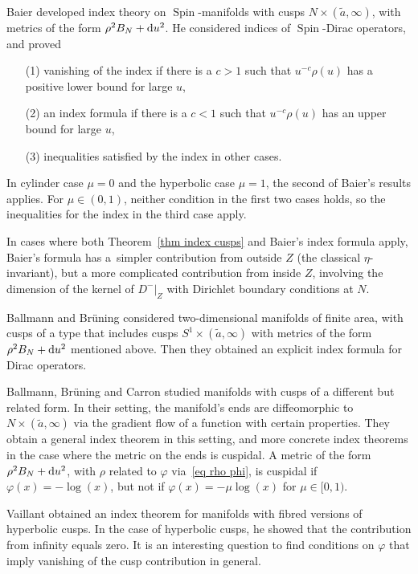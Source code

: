 \documentclass[pdftex]{sigma}%
\numberwithin{equation}{section}
\DeclareMathOperator{\Spin}{Spin}
\begin{document}
Baier \cite{Baier02} developed
index theory on $\Spin$-manifolds with cusps $N\times (\tilde a, \infty)$, with metrics of the form $\rho^2 B_N + {\rm d}u^2$.
He considered indices of $\Spin$-Dirac operators, and proved
\begin{enumerate}\itemsep=0pt
\item[(1)] vanishing of the index if there is a $c>1$ such that $u^{-c} \rho(u)$ has a positive lower bound for large $u$,
\item[(2)] an index formula if there is a $c<1$ such that $u^{-c} \rho(u)$ has an upper bound for large $u$,
\item[(3)] inequalities satisfied by the index in other cases.
\end{enumerate}

 In cylinder case $\mu = 0$ and the hyperbolic case $\mu = 1$, the second of Baier's results applies. For $\mu \in (0,1)$, neither condition in the first two cases holds, so the inequalities for the index in the third case apply.

In cases where both Theorem~\ref{thm index cusps} and Baier's index formula apply, Baier's formula has a~simpler contribution from outside $Z$ (the classical $\eta$-invariant), but a more complicated contribution from inside $Z$, involving the dimension of the kernel of $D^-|_Z$ with Dirichlet boundary conditions at $N$.

Ballmann and
Br\"uning \cite{BB03} considered two-dimensional manifolds of finite area, with cusps of a type that includes
 cusps $S^1 \times (\tilde a, \infty)$ with metrics of the form $\rho^2 B_N + {\rm d}u^2$ mentioned above. Then they obtained an explicit index formula for Dirac operators.

 Ballmann,
Br\"uning and Carron \cite{BBC12} studied manifolds with cusps of a different but related form. In their setting, the manifold's ends are diffeomorphic to $N \times (\tilde a, \infty)$ via the gradient flow of a function with certain properties. They obtain a general index theorem in this setting, and more concrete index theorems in the case where the metric on the ends is cuspidal. A metric of the form $\rho^2 B_N + {\rm d}u^2$, with $\rho$ related to $\varphi$ via~\eqref{eq rho phi}, is cuspidal if $\varphi(x) =-\log(x)$, but not if $\varphi(x) =-\mu \log(x)$ for $\mu \in [0,1)$.

Vaillant \cite{Vaillant01} obtained an index theorem for manifolds with fibred versions of hyperbolic cusps. In the case of hyperbolic cusps, he showed that the contribution from infinity equals zero. It is an interesting question to find conditions on $\varphi$ that imply vanishing of the cusp contribution in general.
\end{document}
